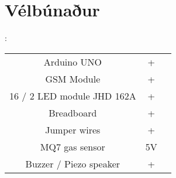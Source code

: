 \section{Vélbúnaður}
:

\begin{center}
\begin{tabular}{ |c|c|c| } 
 \hline 
 Arduino UNO & + &\\ 
 GSM Module & + & \\ 
 16 / 2 LED module JHD 162A & + & \\
 Breadboard & + & \\
 Jumper wires & + & \\
 MQ7 gas sensor & 5V & \\
 Buzzer / Piezo speaker & +  & \\
 \hline
\end{tabular}
\end{center}